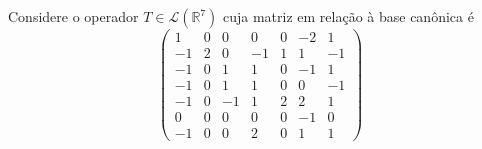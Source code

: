 \documentclass[11pt,a4paper]{article}
\begin{document}
\begin{exercicio}
Considere o operador $T \in \mathcal{L}(\mathbb{R}^7)$ cuja matriz em relação à base canônica é
\[
\begin{pmatrix}
1 &0 &0 &0 &0 &-2& 1 \\
-1& 2 &0 &-1 &1 &1& -1 \\
-1 &0 &1 &1 &0 &-1 &1 \\
-1 &0 &1 &1& 0 &0& -1 \\
-1 &0 &-1 &1 &2 &2& 1 \\
0 &0 &0 &0 &0 &-1& 0 \\
-1& 0& 0& 2& 0 &1 &1
\end{pmatrix}
\]
\end{exercicio}
\end{document}
